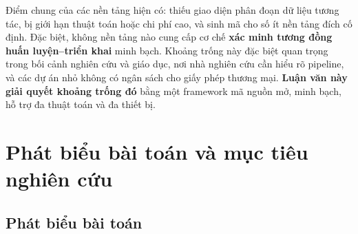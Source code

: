 \begin{table}[H]
\centering
\caption{So sánh các nền tảng Edge ML cho nhận dạng hoạt động}
\label{tab:platform_comparison}
%
\end{table}

Điểm chung của các nền tảng hiện có: thiếu giao diện phân đoạn dữ liệu tương tác, bị giới hạn thuật toán hoặc chi phí cao, và sinh mã cho số ít nền tảng đích cố định. Đặc biệt, không nền tảng nào cung cấp cơ chế \textbf{xác minh tương đồng huấn luyện--triển khai} minh bạch. Khoảng trống này đặc biệt quan trọng trong bối cảnh nghiên cứu và giáo dục, nơi nhà nghiên cứu cần hiểu rõ pipeline, và các dự án nhỏ không có ngân sách cho giấy phép thương mại. \textbf{Luận văn này giải quyết khoảng trống đó} bằng một framework mã nguồn mở, minh bạch, hỗ trợ đa thuật toán và đa thiết bị.

\section{Phát biểu bài toán và mục tiêu nghiên cứu}
\label{sec:intro_problem}

\subsection{Phát biểu bài toán}

